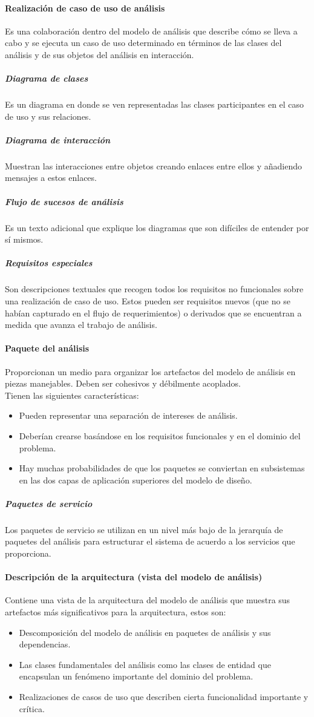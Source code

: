 \paragraph{Realización de caso de uso de análisis}
Es una colaboración dentro del modelo de análisis que describe cómo se lleva a cabo y se ejecuta un caso de uso determinado en términos de las clases del análisis y de sus objetos del análisis en interacción.
\subparagraph{Diagrama de clases}
Es un diagrama en donde se ven representadas las clases participantes en el caso de uso y sus relaciones.
\subparagraph{Diagrama de interacción}
Muestran las interacciones entre objetos creando enlaces entre ellos y añadiendo mensajes a estos enlaces.
\subparagraph{Flujo de sucesos de análisis}
Es un texto adicional que explique los diagramas que son difíciles de entender por sí mismos.
\subparagraph{Requisitos especiales} Son descripciones textuales que recogen todos los requisitos no funcionales sobre una realización de caso de uso. Estos pueden ser requisitos nuevos (que no se habían capturado en el flujo de requerimientos) o derivados que se encuentran a medida que avanza el trabajo de análisis.
\paragraph{Paquete del análisis}
Proporcionan un medio para organizar los artefactos del modelo de análisis en piezas manejables. Deben ser cohesivos y débilmente acoplados.\\
Tienen las siguientes características:
\begin{itemize}
\item Pueden representar una separación de intereses de análisis.
\item Deberían crearse basándose en los requisitos funcionales y en el dominio del problema.
\item Hay muchas probabilidades de que  los paquetes se conviertan en subsistemas en las dos capas de aplicación superiores del modelo de diseño.
\end{itemize}
\subparagraph{Paquetes de servicio}
Los paquetes de servicio se utilizan en un nivel más bajo de la jerarquía de paquetes del análisis para estructurar el sistema de acuerdo a los servicios que proporciona.
\paragraph{Descripción de la arquitectura (vista del modelo de análisis)}
Contiene una vista de la arquitectura del modelo de análisis que muestra sus artefactos más significativos para la arquitectura, estos son:
\begin{itemize}
\item Descomposición del modelo de análisis en paquetes de análisis y sus dependencias.
\item Las clases fundamentales del análisis como las clases de entidad que encapsulan un fenómeno importante del dominio del problema.
\item Realizaciones de casos de uso que describen cierta funcionalidad importante y crítica.
\end{itemize} 
